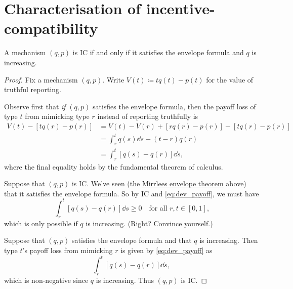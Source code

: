 \section{Characterisation of incentive-compatibility}
\label{sec:ch1:ic}

\begin{namedthm}
	\label{proposition:SM_lemma}
	A mechanism $(q,p)$ is IC if and only if
	it satisfies the envelope formula
	and $q$ is increasing.
\end{namedthm}

\begin{proof}
	Fix a mechanism $(q,p)$.
	Write $V(t) \coloneqq t q(t) - p(t)$ for the value of truthful reporting.

	Observe first that \emph{if} $(q,p)$ satisfies the envelope formula, then the payoff loss of type $t$ from mimicking type $r$ instead of reporting truthfully is
	\begin{align}
		V(t) - [ t q(r) - p(r) ]
		&= V(t) - V(r)
		+ [ r q(r) - p(r) ]
		- [ t q(r) - p(r) ]
		\nonumber
		\\
		&= \int_r^t q(s) \dd s
		- (t-r) q(r)
		\nonumber
		\\
		&= \int_r^t \left[ q(s) - q(r) \right] \dd s ,
		\label{eq:dev_payoff}
		\tag{$\star$}
	\end{align}
	where the final equality holds by the fundamental theorem of calculus.

	Suppose that $(q,p)$ is IC.
	We've seen (the \hyperref[proposition:ic_env]{Mirrlees envelope theorem} above) that it satisfies the envelope formula.
	So by IC and \eqref{eq:dev_payoff}, we must have 
	\begin{equation*}
		\int_r^t \left[ q(s) - q(r) \right] \dd s \geq 0
		\quad \text{for all $r,t \in [0,1]$,}
	\end{equation*}
	which is only possible if $q$ is increasing.
	(Right? Convince yourself.)

	Suppose that $(q,p)$ satisfies the envelope formula and that $q$ is increasing.
	Then type $t$'s payoff loss from mimicking $r$ is given by \eqref{eq:dev_payoff} as
	\begin{equation*}
		\int_r^t \left[ q(s) - q(r) \right] \dd s ,
	\end{equation*}
	which is non-negative since $q$ is increasing.
	Thus $(q,p)$ is IC.
\end{proof}


